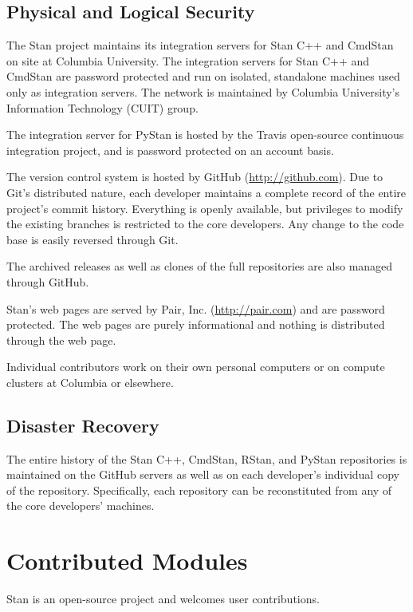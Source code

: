\section{Physical and Logical Security}

The Stan project maintains its integration servers for Stan C++ and
CmdStan on site at Columbia University. The integration servers for
Stan C++ and CmdStan are password protected and run on isolated,
standalone machines used only as integration servers. The network is
maintained by Columbia University's Information Technology (CUIT)
group.

The integration server for PyStan is hosted by the Travis open-source
continuous integration project, and is password protected on an
account basis.

The version control system is hosted by GitHub
(\url{http://github.com}). Due to Git's distributed nature, each
developer maintains a complete record of the entire project's commit
history. Everything is openly available, but privileges to modify the
existing branches is restricted to the core developers. Any change to
the code base is easily reversed through Git.

The archived releases as well as clones of the full repositories are
also managed through GitHub.

Stan's web pages are served by Pair, Inc. (\url{http://pair.com}) and
are password protected.  The web pages are purely informational and
nothing is distributed through the web page.

Individual contributors work on their own personal computers or on
compute clusters at Columbia or elsewhere.


\section{Disaster Recovery}

The entire history of the Stan C++, CmdStan, RStan, and PyStan
repositories is maintained on the GitHub servers as well as on each
developer's individual copy of the repository. Specifically, each
repository can be reconstituted from any of the core 
developers' machines.

\chapter{Contributed Modules}

\noindent
Stan is an open-source project and welcomes user contributions.  

